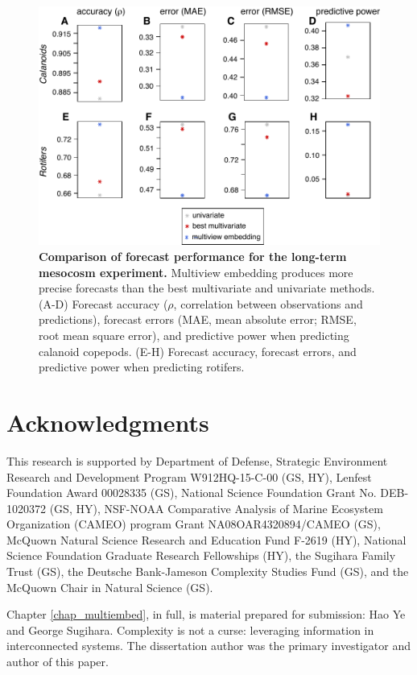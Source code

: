 \begin{figure}[!ht]
\begin{center}\includegraphics[width=\textwidth]{fig_multiembed_ed_4.pdf}\end{center}
\caption[Comparison of forecast performance for the long-term mesocosm experiment.]{\textbf{Comparison of forecast performance for the long-term mesocosm experiment.}\newline
Multiview embedding produces more precise forecasts than the best multivariate and univariate methods. (A-D) Forecast accuracy ($\rho$, correlation between observations and predictions), forecast errors (MAE, mean absolute error; RMSE, root mean square error), and predictive power when predicting calanoid copepods. (E-H) Forecast accuracy, forecast errors, and predictive power when predicting rotifers.}
\label{fig_multiembed_ed_4}
\end{figure}

\section{Acknowledgments}
This research is supported by Department of Defense, Strategic Environment Research and Development Program W912HQ-15-C-00 (GS, HY), Lenfest Foundation Award 00028335 (GS), National Science Foundation Grant No. DEB-1020372 (GS, HY), NSF-NOAA Comparative Analysis of Marine Ecosystem Organization (CAMEO) program Grant NA08OAR4320894/CAMEO (GS), McQuown Natural Science Research and Education Fund F-2619 (HY), National Science Foundation Graduate Research Fellowships (HY), the Sugihara Family Trust (GS), the Deutsche Bank-Jameson Complexity Studies Fund (GS), and the McQuown Chair in Natural Science (GS).

Chapter \ref{chap_multiembed}, in full, is material prepared for submission: Hao Ye and George Sugihara. Complexity is not a curse: leveraging information in interconnected systems. The dissertation author was the primary investigator and author of this paper.